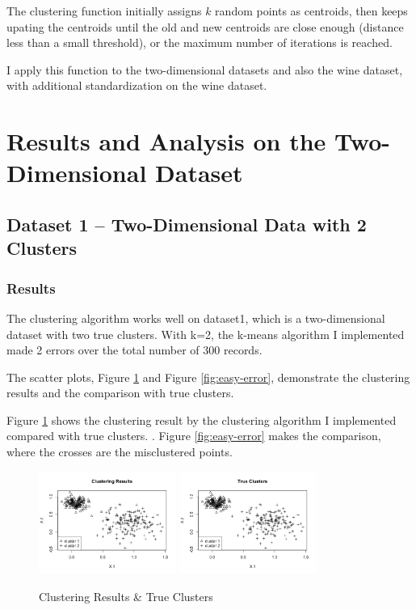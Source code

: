 \documentclass{article}
\begin{document}
	The clustering function initially assigns $k$ random points as centroids, then keeps upating the centroids until the old and new centroids are close enough (distance less than a small threshold), or the maximum number of iterations is reached.

	I apply this function to the two-dimensional datasets and also the wine dataset, with additional standardization on the wine dataset.

\section{Results and Analysis on the Two-Dimensional Dataset}
	\subsection{Dataset 1 -- Two-Dimensional Data with 2 Clusters}
		\subsubsection{Results}
		The clustering algorithm works well on dataset1, which is a two-dimensional dataset with two true clusters. With k=2, the k-means algorithm I implemented made 2 errors over the total number of 300 records.

		The scatter plots, Figure \ref{fig:easy-cluster} and Figure \ref{fig:easy-error}, demonstrate the clustering results and the comparison with true clusters.

		Figure \ref{fig:easy-cluster} shows the clustering result by the clustering algorithm I implemented compared with true clusters. . Figure \ref{fig:easy-error} makes the comparison, where the crosses are the misclustered points.

		\begin{figure}[H]
		\centering
		\includegraphics[width = 0.4\textwidth]{easy_cluster.png}
		\includegraphics[width = 0.4\textwidth]{easy_true_cluster.png}
		\caption{Clustering Results \& True Clusters}
		\label{fig:easy-cluster}
		\end{figure}
\end{document}
